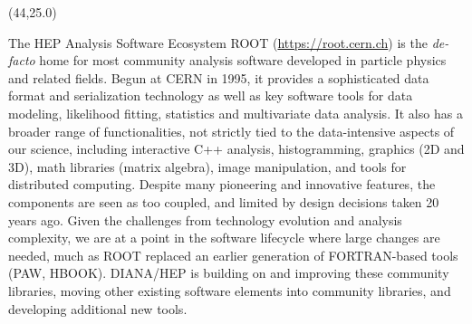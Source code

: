 \documentclass[final]{beamer}
\begin{document}
\begin{frame}{}
\begin{textblock}{38.0}(44,25.0)
\begin{block}{The HEP Analysis Software Ecosystem}
ROOT (\url{https://root.cern.ch}) is
the {\em de-facto} home for most community analysis
software developed in particle physics and related fields. Begun at CERN in 1995,
it provides a sophisticated data format and serialization technology
as well as key software tools for
data modeling, likelihood fitting, statistics and
multivariate data analysis. It also has a broader range of
functionalities, not strictly tied to the data-intensive aspects
of our science, including interactive C++ analysis, histogramming,
graphics (2D and 3D), math libraries (matrix algebra), image manipulation,
and tools for distributed computing. Despite many pioneering and
innovative features, the components are seen as too coupled,
and limited by design decisions taken 20 years ago.
Given the challenges from technology evolution and analysis complexity,
we are at a point in the software lifecycle where large changes are needed,
much as ROOT replaced an earlier generation of
FORTRAN-based tools (PAW, HBOOK).
DIANA/HEP is building on and improving these
community libraries, moving other existing software elements into
community libraries, and developing additional new tools.
\end{block}
\end{textblock}




\end{frame}
\end{document}
